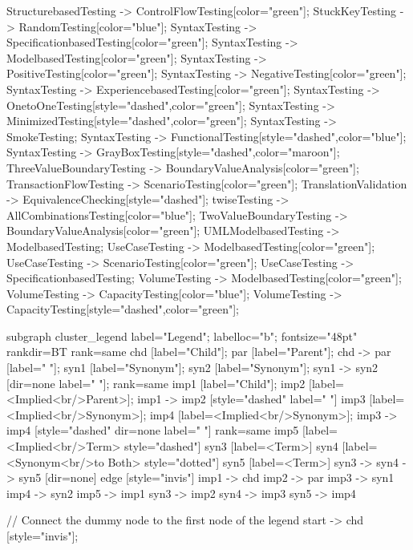 \documentclass{article}
\begin{document}
{StructurebasedTesting -> ControlFlowTesting[color="green"];
StuckKeyTesting -> RandomTesting[color="blue"];
SyntaxTesting -> SpecificationbasedTesting[color="green"];
SyntaxTesting -> ModelbasedTesting[color="green"];
SyntaxTesting -> PositiveTesting[color="green"];
SyntaxTesting -> NegativeTesting[color="green"];
SyntaxTesting -> ExperiencebasedTesting[color="green"];
SyntaxTesting -> OnetoOneTesting[style="dashed",color="green"];
SyntaxTesting -> MinimizedTesting[style="dashed",color="green"];
SyntaxTesting -> SmokeTesting;
SyntaxTesting -> FunctionalTesting[style="dashed",color="blue"];
SyntaxTesting -> GrayBoxTesting[style="dashed",color="maroon"];
ThreeValueBoundaryTesting -> BoundaryValueAnalysis[color="green"];
TransactionFlowTesting -> ScenarioTesting[color="green"];
TranslationValidation -> EquivalenceChecking[style="dashed"];
twiseTesting -> AllCombinationsTesting[color="blue"];
TwoValueBoundaryTesting -> BoundaryValueAnalysis[color="green"];
UMLModelbasedTesting -> ModelbasedTesting;
UseCaseTesting -> ModelbasedTesting[color="green"];
UseCaseTesting -> ScenarioTesting[color="green"];
UseCaseTesting -> SpecificationbasedTesting;
VolumeTesting -> ModelbasedTesting[color="green"];
VolumeTesting -> CapacityTesting[color="blue"];
VolumeTesting -> CapacityTesting[style="dashed",color="green"];

subgraph cluster_legend {
    label="Legend";
    labelloc="b";
    fontsize="48pt"
    rankdir=BT
    {
        rank=same
        chd [label="Child"];
        par [label="Parent"];
        chd -> par [label="                "];
        syn1 [label="Synonym"];
        syn2 [label="Synonym"];
        syn1 -> syn2 [dir=none label="                "];
    }
    {
        rank=same
        imp1 [label="Child"];
        imp2 [label=<Implied<br/>Parent>];
        imp1 -> imp2 [style="dashed" label="                "]
        imp3 [label=<Implied<br/>Synonym>];
        imp4 [label=<Implied<br/>Synonym>];
        imp3 -> imp4 [style="dashed" dir=none label="                "]
    }
    {
        rank=same
        imp5 [label=<Implied<br/>Term> style="dashed"]
        syn3 [label=<Term>]
        syn4 [label=<Synonym<br/>to Both> style="dotted"]
        syn5 [label=<Term>]
        syn3 -> syn4 -> syn5 [dir=none]
    }
    edge [style="invis"]
    imp1 -> chd
    imp2 -> par
    imp3 -> syn1
    imp4 -> syn2
imp5 -> imp1
syn3 -> imp2
syn4 -> imp3
syn5 -> imp4
}

// Connect the dummy node to the first node of the legend
start -> chd [style="invis"];
}
\end{document}
